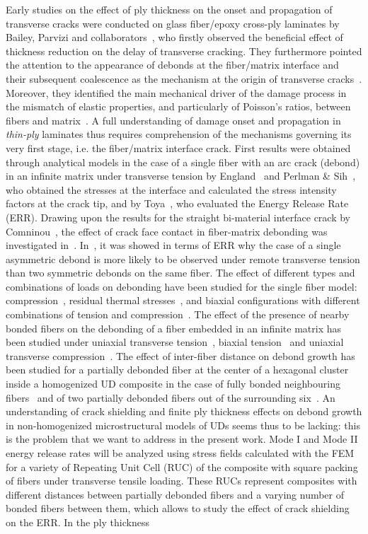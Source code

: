 \documentclass[review]{elsarticle}
\begin{document}
Early studies on the effect of ply thickness on the onset and propagation of transverse cracks were conducted on glass fiber/epoxy cross-ply laminates by Bailey, Parvizi and collaborators~\cite{Garrett1977,Parvizi1978a,Parvizi1978b}, who firstly observed the beneficial effect of thickness reduction on the delay of transverse cracking. They furthermore pointed the attention to the appearance of debonds at the fiber/matrix interface and their subsequent coalescence as the mechanism at the origin of transverse cracks~\cite{Bailey1981}. Moreover, they identified the main mechanical driver of the damage process in the mismatch of elastic properties, and particularly of Poisson's ratios, between fibers and matrix~\cite{Bailey1979}. A full understanding of damage onset and propagation in \emph{thin-ply} laminates thus requires comprehension of the mechanisms governing its very first stage, i.e. the fiber/matrix interface crack. First results were obtained through analytical models in the case of a single fiber with an arc crack (debond) in an infinite matrix under transverse tension by England~\cite{England1966} and Perlman \& Sih~\cite{Perlman1967}, who obtained the stresses at the interface and calculated the stress intensity factors at the crack tip, and by Toya~\cite{Toya1974}, who evaluated the Energy Release Rate (ERR). Drawing upon the results for the straight bi-material interface crack by Comninou~\cite{Comninou1977}, the effect of crack face contact in fiber-matrix debonding was investigated in~\cite{Paris1996,Varna1997a}. In~\cite{Garcia2015}, it was showed in terms of ERR why the case of a single asymmetric debond is more likely to be observed under remote transverse tension than two symmetric debonds on the same fiber. The effect of different types and combinations of loads on debonding have been studied for the single fiber model: compression~\cite{Correa2007}, residual thermal stresses~\cite{Correa2011}, and biaxial configurations with different combinations of tension and compression~\cite{Correa2013, Correa2014}. The effect of the presence of nearby bonded fibers on the debonding of a fiber embedded in an infinite matrix has been studied under uniaxial transverse tension~\cite{Sandino2016}, biaxial tension~\cite{Sandino2016b} and uniaxial transverse compression~\cite{Sandino2018}. The effect of inter-fiber distance on debond growth has been studied for a partially debonded fiber at the center of a hexagonal cluster inside a homogenized UD composite in the case of fully bonded neighbouring fibers~\cite{Zhuang2018} and of two partially debonded fibers out of the surrounding six~\cite{Varna2017}. An understanding of crack shielding and finite ply thickness effects on debond growth in non-homogenized microstructural models of UDs seems thus to be lacking: this is the problem that we want to address in the present work. Mode I and Mode II energy release rates will be analyzed using stress fields calculated with the FEM for a variety of Repeating Unit Cell (RUC) of the composite with square packing of fibers under transverse tensile loading. These RUCs represent composites with different distances between partially debonded fibers and a varying number of bonded fibers between them, which allows to study the effect of crack shielding on the ERR. In the ply thickness 
\end{document}
